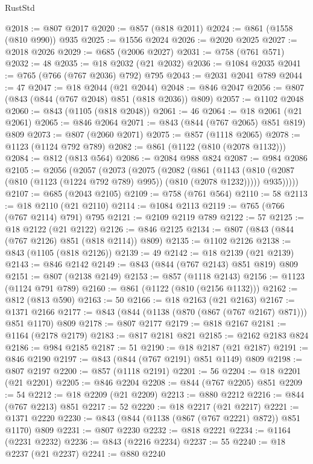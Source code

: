\begin{lexlean}{RustStd}
\begin{coremodule}
@2018 := @807 @2017
@2020 := @857 (@818 @2011)
@2024 := @861 (@1558 (@810 @990)) @935
@2025 := @1556 @2024
@2026 := @2020 @2025
@2027 := @2018 @2026
@2029 := @685 (@2006 @2027)
@2031 := @758 (@761 @571)
@2032 := 48
@2035 := @18 @2032 (@21 @2032)
@2036 := @1084 @2035
@2041 := @765 (@766 (@767 @2036) @792) @795
@2043 := @2031 @2041 @789
@2044 := 47
@2047 := @18 @2044 (@21 @2044)
@2048 := @846 @2047
@2056 := @807 (@843 (@844 (@767 @2048) @851 (@818 @2036)) @809)
@2057 := @1102 @2048
@2060 := @843 (@1105 (@818 @2048))
@2061 := 46
@2064 := @18 @2061 (@21 @2061)
@2065 := @846 @2064
@2071 := @843 (@844 (@767 @2065) @851 @819) @809
@2073 := @807 (@2060 @2071)
@2075 := @857 (@1118 @2065)
@2078 := @1123 (@1124 @792 @789)
@2082 := @861 (@1122 (@810 (@2078 @1132)))
@2084 := @812 (@813 @564)
@2086 := @2084 @988 @824
@2087 := @984 @2086
@2105 := @2056
    (@2057
      (@2073
        (@2075
          (@2082
            (@861
              (@1143 (@810 (@2087 (@810 (@1123 (@1224 @792 @789) @995)) (@810 (@2078 @1232)))))
              @935)))))
@2107 := @685 (@2043 @2105)
@2109 := @758 (@761 @564)
@2110 := 58
@2113 := @18 @2110 (@21 @2110)
@2114 := @1084 @2113
@2119 := @765 (@766 (@767 @2114) @791) @795
@2121 := @2109 @2119 @789
@2122 := 57
@2125 := @18 @2122 (@21 @2122)
@2126 := @846 @2125
@2134 := @807 (@843 (@844 (@767 @2126) @851 (@818 @2114)) @809)
@2135 := @1102 @2126
@2138 := @843 (@1105 (@818 @2126))
@2139 := 49
@2142 := @18 @2139 (@21 @2139)
@2143 := @846 @2142
@2149 := @843 (@844 (@767 @2143) @851 @819) @809
@2151 := @807 (@2138 @2149)
@2153 := @857 (@1118 @2143)
@2156 := @1123 (@1124 @791 @789)
@2160 := @861 (@1122 (@810 (@2156 @1132)))
@2162 := @812 (@813 @590)
@2163 := 50
@2166 := @18 @2163 (@21 @2163)
@2167 := @1371 @2166
@2177 := @843 (@844 (@1138 (@870 (@867 (@767 @2167) @871))) @851 @1170) @809
@2178 := @807 @2177
@2179 := @818 @2167
@2181 := @1164 (@2178 @2179)
@2183 := @817 @2181 @821
@2185 := @2162 @2183 @824
@2186 := @984 @2185
@2187 := 51
@2190 := @18 @2187 (@21 @2187)
@2191 := @846 @2190
@2197 := @843 (@844 (@767 @2191) @851 @1149) @809
@2198 := @807 @2197
@2200 := @857 (@1118 @2191)
@2201 := 56
@2204 := @18 @2201 (@21 @2201)
@2205 := @846 @2204
@2208 := @844 (@767 @2205) @851
@2209 := 54
@2212 := @18 @2209 (@21 @2209)
@2213 := @880 @2212
@2216 := @844 (@767 @2213) @851
@2217 := 52
@2220 := @18 @2217 (@21 @2217)
@2221 := @1371 @2220
@2230 := @843 (@844 (@1138 (@867 (@767 @2221) @872)) @851 @1170) @809
@2231 := @807 @2230
@2232 := @818 @2221
@2234 := @1164 (@2231 @2232)
@2236 := @843 (@2216 @2234)
@2237 := 55
@2240 := @18 @2237 (@21 @2237)
@2241 := @880 @2240

\end{coremodule}
\end{lexlean}
